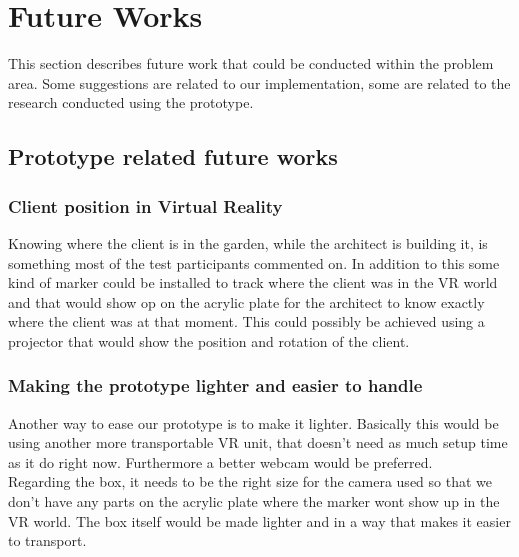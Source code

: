 \chapter{Future Works}
This section describes future work that could be conducted within the problem area. Some suggestions are related to our implementation, some are related to the research conducted using the prototype.
\section{Prototype related future works}

\subsection*{Client position in Virtual Reality}
Knowing where the client is in the garden, while the architect is building it, is something most of the test participants commented on. In addition to this some kind of marker could be installed to track where the client was in the VR world and that would show op on the acrylic plate for the architect to know exactly where the client was at that moment. This could possibly be achieved using a projector that would show the position and rotation of the client.

\subsection*{Making the prototype lighter and easier to handle}
Another way to ease our prototype is to make it lighter. Basically this would be using another more transportable VR unit, that doesn't need as much setup time as it do right now. Furthermore a better webcam would be preferred.\\
Regarding the box, it needs to be the right size for the camera used so that we don't have any parts on the acrylic plate where the marker wont show up in the VR world. The box itself would be made lighter and in a way that makes it easier to transport.

